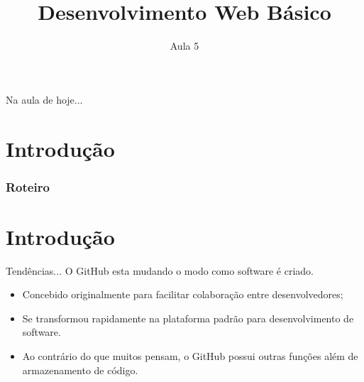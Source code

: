 \documentclass{beamer}
\date{}
\title{Desenvolvimento Web Básico}
\subtitle{Aula 5}
\begin{document}
\frame{
 \titlepage
}

\begin{frame}{Na aula de hoje...} 
\tableofcontents 
\end{frame}

\section{Introdução}
\begin{frame}
\frametitle{Roteiro} %
\tableofcontents %
\end{frame}
\section{Introdução}
\begin{frame}{Tendências...}
  O GitHub esta mudando o modo como software é criado.
\begin{itemize}
  \item Concebido originalmente para facilitar colaboração entre 
desenvolvedores;
   \item Se transformou rapidamente na plataforma padrão para 
desenvolvimento de software.
   \item Ao contrário do que muitos pensam, o GitHub possui outras 
funções além de armazenamento de código.
\end{itemize}
\end{frame}
\end{document}
